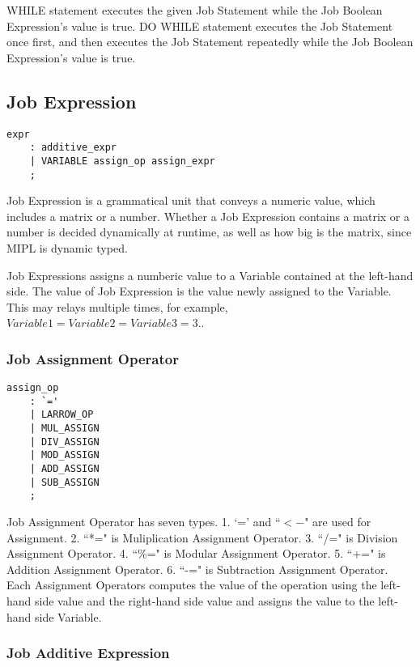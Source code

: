 \documentclass[prodmode,acmtecs]{acmsmall}
\begin{document}
WHILE statement executes the given Job Statement while the Job
Boolean Expression's value is true.  DO WHILE statement executes the
Job Statement once first, and then executes the Job Statement repeatedly
while the Job Boolean Expression's value is true.
\medskip


\subsection{Job Expression}

\begin{lstlisting}
expr
	: additive_expr
	| VARIABLE assign_op assign_expr
	;
\end{lstlisting}

\label{Expression_Section}
Job Expression is a grammatical unit that conveys a numeric value,
which includes a matrix or a number.  Whether a Job Expression
contains a matrix or a number is decided dynamically at runtime,
as well as how big is the matrix, since MIPL is dynamic typed.

Job Expressions assigns a numberic value to a Variable contained
at the left-hand side.  The value of Job Expression is the value
newly assigned to the Variable.  This may relays multiple times,
for example, $Variable1 = Variable2 = Variable3 = 3.$.
\medskip


\subsubsection{Job Assignment Operator}

\begin{lstlisting}
assign_op
	: `='
	| LARROW_OP
	| MUL_ASSIGN
	| DIV_ASSIGN
	| MOD_ASSIGN
	| ADD_ASSIGN
	| SUB_ASSIGN
	;
\end{lstlisting}

Job Assignment Operator has seven types.  1. `=' and ``$<-$" are used
for Assignment.  2. ``*=" is Muliplication Assignment Operator.  3. 
``/=" is Division Assignment Operator.  4. ``\%=" is Modular Assignment
Operator.  5. ``+=" is Addition Assignment Operator.  6. ``-=" is
Subtraction Assignment Operator.  Each Assignment Operators computes
the value of the operation using the left-hand side value and the
right-hand side value and assigns the value to the left-hand side
Variable.
\medskip



\subsubsection{Job Additive Expression}
\end{document}
